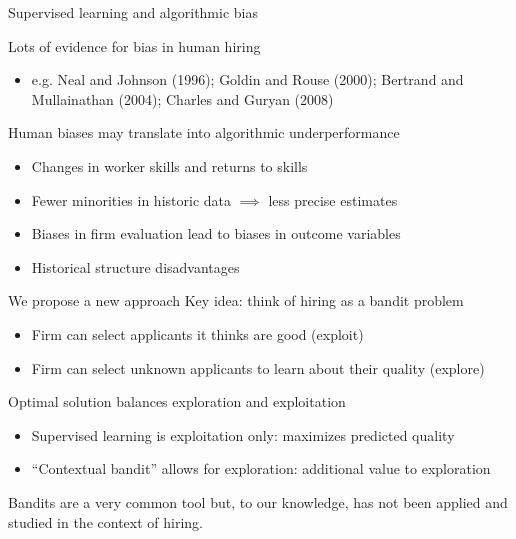 \documentclass[aspectratio=169,t,11pt,table]{beamer}
\begin{document}
\begin{frame}{Supervised learning and algorithmic bias} \small 

\alert{Lots of evidence for bias in human hiring}
\begin{itemize}
\item  e.g. Neal and Johnson (1996); Goldin and Rouse (2000); Bertrand and Mullainathan (2004); Charles and Guryan (2008)
\end{itemize}
\bigskip
\pause
\alert{Human biases may translate into algorithmic underperformance}
\begin{itemize}
\item Changes in worker skills and returns to skills
\item Fewer minorities in historic data $\implies$ less precise estimates 
\item Biases in firm evaluation lead to biases in outcome variables
\item Historical structure disadvantages
\end{itemize}
\end{frame}


\begin{frame}{We propose a new approach} \small 
\alert{Key idea: think of hiring as a bandit problem}
\begin{itemize}
\item Firm can select applicants it thinks are good (exploit)
\item Firm can select unknown applicants to learn about their quality (explore)
\end{itemize}
 \bigskip \pause 
\alert{Optimal solution balances exploration and exploitation}
\begin{itemize}
\item Supervised learning is exploitation only: maximizes predicted quality  \smallskip
\item ``Contextual bandit'' allows for exploration: additional value to exploration
\end{itemize}
\bigskip
\alert{Bandits are a very common tool but, to our knowledge, has not been applied and studied in the context of hiring. }
\end{frame}
\end{document}
